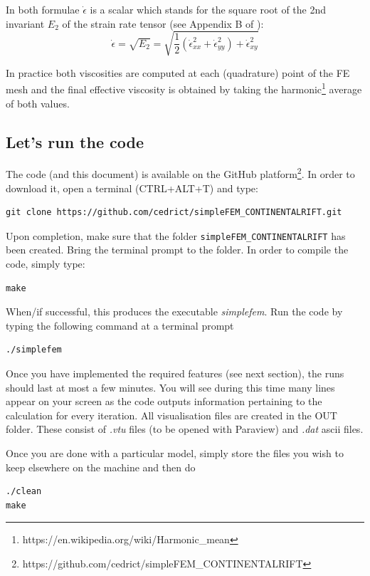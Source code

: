 \documentclass[a4paper]{article}
\begin{document}
In both formulae $\dot{\epsilon}$ is a scalar which stands for the square root of the 2nd invariant $E_2$ of the strain rate tensor (see Appendix B of \cite{thie11}):
\[
\dot{\epsilon}=\sqrt{E_2} = \sqrt{ \frac{1}{2}(\dot{\epsilon}_{xx}^2+\dot{\epsilon}_{yy}^2)+\dot{\epsilon}_{xy}^2 }
\]

In practice both viscosities are computed at each (quadrature) point of the FE mesh and the final effective viscosity 
is obtained by taking the harmonic\footnote{https://en.wikipedia.org/wiki/Harmonic\_mean} average of both values.

\subsection{Let's run the code}

The code (and this document) is available on the GitHub platform\footnote{https://github.com/cedrict/simpleFEM\_CONTINENTALRIFT}. 
In order to download it, open a terminal (CTRL+ALT+T) and type:
\begin{verbatim}
git clone https://github.com/cedrict/simpleFEM_CONTINENTALRIFT.git
\end{verbatim}
Upon completion, make sure that the folder {\tt simpleFEM\_CONTINENTALRIFT} has been created. Bring the 
terminal prompt to the folder.
In order to compile the code, simply type:
\begin{verbatim}
make
\end{verbatim}
When/if successful, this produces the executable {\sl simplefem}.
Run the code by typing the following command at a terminal prompt 
\begin{verbatim}
./simplefem
\end{verbatim}


Once you have implemented the required features (see next section), the runs should last at most a few minutes. 
You will see during this time many lines appear
on your screen as the code outputs information pertaining to the calculation for every iteration.
All visualisation files are created in the OUT folder. These consist of {\sl .vtu} files (to be opened with Paraview) and {\sl .dat} ascii files. 


Once you are done with a particular model, simply store the files you wish to keep elsewhere on the machine and then do
\begin{verbatim}
./clean
make
\end{verbatim}
\end{document}
